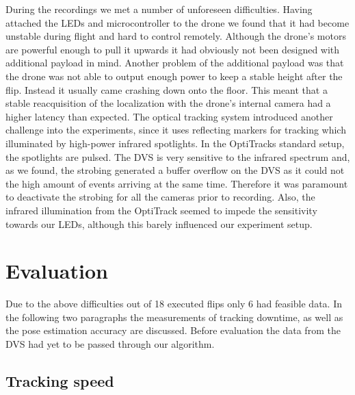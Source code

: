 During the recordings we met a number of unforeseen difficulties. Having attached the LEDs and microcontroller to the drone we found that it had become unstable during flight and hard to control remotely. Although the drone's motors are powerful enough to pull it upwards it had obviously not been designed with additional payload in mind. Another problem of the additional payload was that the drone was not able to output enough power to keep a stable height after the flip. Instead it usually came crashing down onto the floor. This meant that a stable reacquisition of the localization with the drone's internal camera had a higher latency than expected. 
The optical tracking system introduced another challenge into the experiments, since it uses reflecting markers for tracking which illuminated by high-power infrared spotlights. In the OptiTracks standard setup, the spotlights are pulsed. The DVS is very sensitive to the infrared spectrum and, as we found, the strobing generated a buffer overflow on the DVS as it could not the high amount of events arriving at the same time. Therefore it was paramount to deactivate the strobing for all the cameras prior to recording. Also, the infrared illumination from the OptiTrack seemed to impede the sensitivity towards our LEDs, although this barely influenced our experiment setup.


\section{Evaluation}\label{sec:evaluation}

Due to the above difficulties out of 18 executed flips only 6 had feasible data. In the following two paragraphs the measurements of tracking downtime, as well as the pose estimation accuracy are discussed. Before evaluation the data from the DVS had yet to be passed through our algorithm. 


\subsection{Tracking speed}\label{sec:trackingspeed}

